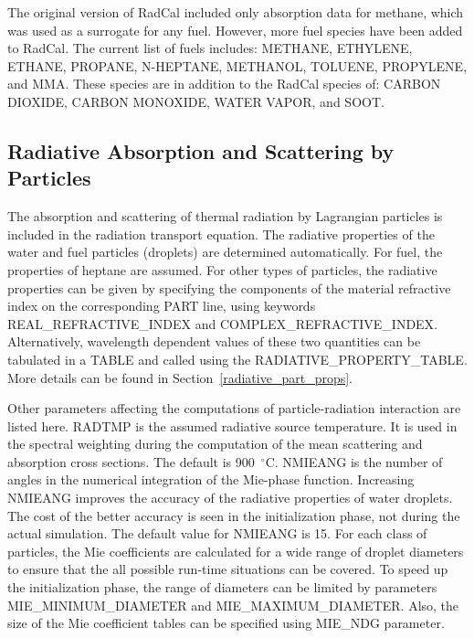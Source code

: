 \documentclass[11pt]{book}
\begin{document}
\label{info:RadCal_fuelspecies}

The original version of RadCal included only absorption data for methane, which was used as a surrogate for any fuel. However, more fuel species have been added to RadCal. The current list of fuels includes: {\ct METHANE}, {\ct ETHYLENE}, {\ct ETHANE}, {\ct PROPANE}, {\ct N-HEPTANE}, {\ct METHANOL}, {\ct TOLUENE}, {\ct PROPYLENE}, and {\ct MMA}. These species are in addition to the RadCal species of: {\ct CARBON DIOXIDE}, {\ct CARBON MONOXIDE}, {\ct WATER VAPOR}, and {\ct SOOT}.



\subsection{Radiative Absorption and Scattering by Particles}

\label{info:RADI_Absorption}

The absorption and scattering of thermal radiation by Lagrangian particles is included in the radiation transport equation. The radiative properties of
the water and fuel particles (droplets) are determined automatically. For fuel, the properties of heptane are assumed. For other types of particles, the
radiative properties can be given by specifying the components of the material refractive index on the corresponding {\ct PART} line, using keywords
{\ct REAL\_REFRACTIVE\_INDEX} and {\ct COMPLEX\_REFRACTIVE\_INDEX}. Alternatively, wavelength dependent values of these two
quantities can be tabulated in a {\ct TABLE} and called using the {\ct RADIATIVE\_PROPERTY\_TABLE}. More details can be found in Section~\ref{radiative_part_props}.

Other parameters affecting the computations of particle-radiation interaction are listed here. {\ct RADTMP} is the assumed radiative source temperature.
It is used in the spectral weighting during the computation of the mean scattering and absorption cross sections. The default is 900~$^\circ$C.
{\ct NMIEANG} is the number of angles in the numerical integration of the Mie-phase function.
Increasing {\ct NMIEANG} improves the accuracy of the radiative properties of water droplets. The cost
of the better accuracy is seen in the initialization phase, not during the actual simulation. The default value for {\ct NMIEANG}
is 15. For each class of particles, the Mie coefficients are calculated for a wide range of droplet diameters to ensure that the all possible run-time
situations can be covered. To speed up the initialization phase, the range of diameters can be limited by parameters {\ct MIE\_MINIMUM\_DIAMETER} and
{\ct MIE\_MAXIMUM\_DIAMETER}. Also, the size of the Mie coefficient tables can be specified using {\ct MIE\_NDG} parameter.
\end{document}
